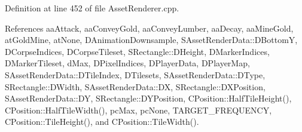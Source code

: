 Definition at line 452 of file Asset\+Renderer.\+cpp.



References aa\+Attack, aa\+Convey\+Gold, aa\+Convey\+Lumber, aa\+Decay, aa\+Mine\+Gold, at\+Gold\+Mine, at\+None, D\+Animation\+Downsample, S\+Asset\+Render\+Data\+::\+D\+BottomY, D\+Corpse\+Indices, D\+Corpse\+Tileset, S\+Rectangle\+::\+D\+Height, D\+Marker\+Indices, D\+Marker\+Tileset, d\+Max, D\+Pixel\+Indices, D\+Player\+Data, D\+Player\+Map, S\+Asset\+Render\+Data\+::\+D\+Tile\+Index, D\+Tilesets, S\+Asset\+Render\+Data\+::\+D\+Type, S\+Rectangle\+::\+D\+Width, S\+Asset\+Render\+Data\+::\+DX, S\+Rectangle\+::\+D\+X\+Position, S\+Asset\+Render\+Data\+::\+DY, S\+Rectangle\+::\+D\+Y\+Position, C\+Position\+::\+Half\+Tile\+Height(), C\+Position\+::\+Half\+Tile\+Width(), pc\+Max, pc\+None, T\+A\+R\+G\+E\+T\+\_\+\+F\+R\+E\+Q\+U\+E\+N\+CY, C\+Position\+::\+Tile\+Height(), and C\+Position\+::\+Tile\+Width().


